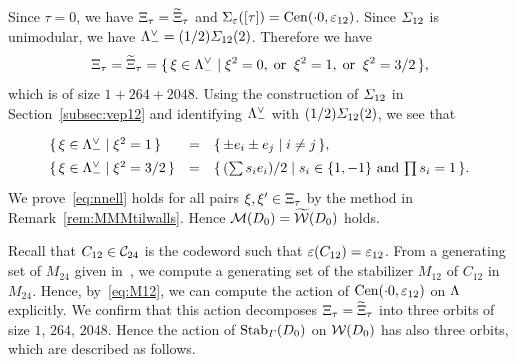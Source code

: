\documentclass{amsart} %
\begin{document}
%
Since $\tau=0$,
we have $\Xi_{\tau}=\widetilde{\Xi}_{\tau}$ and $\Sigma_{\varepsilon}([\tau])=\mathrm{Cen}(\cdot 0, \varepsilon_{12})$.
Since $\varSigma_{12}$ is unimodular,
we have $\Lambda_{-}^{\vee}= (1/2)\varSigma_{12}(2)$.
Therefore we have 
\[
\Xi_{\tau}=\widetilde{\Xi}_{\tau}=\{\,{\xi\in \Lambda_{-}^{\vee}}\mid {\xi^2=0, \;\textrm{or}\; \; \xi^2=1, \;\textrm{or}\; \; \xi^2=3/2} \,\},
\]
which is of size $1+264+2048$.
Using the construction of $\varSigma_{12}$ in Section~\ref{subsec:vep12} and 
identifying $\Lambda_{-}^{\vee}$ with $ (1/2)\varSigma_{12}(2)$,
we see that 
\[
\renewcommand{\arraystretch}{1.4}
\begin{array}{lcl}
\set{\xi\in \Leechminus\dual}{\xi^2=1} &=& \set{\pm e_i\pm e_j}{i\ne j}, \\
\set{\xi\in \Leechminus\dual}{\xi^2=3/2} &=& \set{(\sum s_i e_i)/2}{\textrm{$s_i\in \{1, -1\}$ and $\prod s_i=1$}}. \\
\end{array}
\]
%
%
We prove~\eqref{eq:nnell} holds for all pairs $\xi, \xi^{\prime}\in \Xi_{\tau}$
by the method in Remark~\ref{rem:MMMtilwalls}.
Hence 
$\mathord{\mathcal{M}}(D_0)=\widetilde{\mathord{\mathcal{W}}}(D_0)$ holds.
%
\par 
%
Recall that $C_{12}\in \mathord{\mathcal{C}}_{24}$ is the codeword such that $\varepsilon(C_{12})=\varepsilon_{12}$. 
From a generating set of $M_{24}$ given in~\cite[Chapter 10, Section 2]{theCSbook}, 
we compute a generating set of 
the stabilizer $M_{12}$ of $C_{12}$ in $M_{24}$.
Hence, by~\eqref{eq:M12},
we can compute the action of $\mathrm{Cen}(\cdot 0, \varepsilon_{12})$ on $\Lambda$ explicitly.
We confirm that this action decomposes $\Xi_{\tau}=\widetilde{\Xi}_{\tau}$
into three orbits of size $1$, $264$, $2048$.
Hence the action of $\operatorname{Stab}_{\varGamma}(D_0)$ on $\mathord{\mathcal{W}}(D_0)$ 
has also three orbits,
which are described as follows.
%
\end{document}
